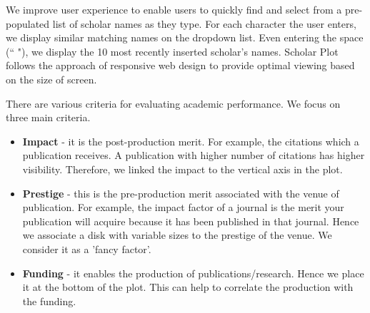 
We improve user experience to enable users to quickly find and select from a pre-populated list of scholar names as they type. For each character the user enters, we display similar matching names on the dropdown list. Even entering the space (`` "), we display the 10 most recently inserted scholar's names. Scholar Plot follows the approach of responsive web design to provide optimal viewing based on the size of screen.





There are various criteria for evaluating academic performance. We focus on three main criteria. 
\begin{itemize}
\item \textbf{Impact} - it is the post-production merit. For example, the citations which a publication receives. A publication with higher number of citations has higher visibility. Therefore, we linked the impact to the vertical axis in the plot.
\item \textbf{Prestige} - this is the pre-production merit associated with the venue of publication. For example, the impact factor of a journal is the merit your publication will acquire because it has been published in that journal. Hence we associate a disk with variable sizes to the prestige of the venue. We consider it as a 'fancy factor'.
\item \textbf{Funding} - it enables the production of publications/research. Hence we place it at the bottom of the plot. This can help to correlate the production with the funding.
\end{itemize}














